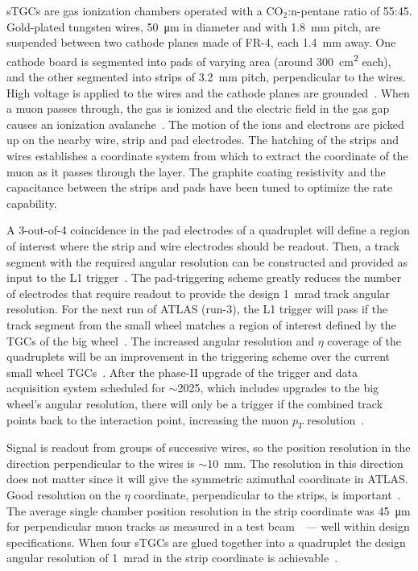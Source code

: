 sTGCs are gas ionization chambers operated with a CO$_2$:n-pentane ratio of 55:45. Gold-plated tungsten wires, \SI{50}{\micro\meter} in diameter and with \SI{1.8}{mm} pitch, are suspended between two cathode planes made of FR-4, each \SI{1.4}{mm} away. One cathode board is segmented into pads of varying area (around \SI{300}{cm^2} each), and the other segmented into strips of \SI{3.2}{mm} pitch, perpendicular to the wires. High voltage is applied to the wires and the cathode planes are grounded~\cite{nsw_tdr, perez-codina_small-strip_2016}. When a muon passes through, the gas is ionized and the electric field in the gas gap causes an ionization avalanche~\cite{townsend_electricity_1915}. The motion of the ions and electrons are picked up on the nearby wire, strip and pad electrodes. The hatching of the strips and wires establishes a coordinate system from which to extract the coordinate of the muon as it passes through the layer. The graphite coating resistivity and the capacitance between the strips and pads have been tuned to optimize the rate capability. 

A 3-out-of-4 coincidence in the pad electrodes of a quadruplet will define a region of interest where the strip and wire electrodes should be readout. Then, a track segment with the required angular resolution can be constructed and provided as input to the L1 trigger~\cite{nsw_tdr}. The pad-triggering scheme greatly reduces the number of electrodes that require readout to provide the design \SI{1}{mrad} track angular resolution. For the next run of ATLAS (run-3), the L1 trigger will pass if the track segment from the small wheel matches a region of interest defined by the TGCs of the big wheel~\cite{tdaq_phase1_tdr, nsw_tdr}. The increased angular resolution and $\eta$ coverage of the quadruplets will be an improvement in the triggering scheme over the current small wheel TGCs~\cite{nsw_tdr}. After the phase-II upgrade of the trigger and data acquisition system scheduled for $\sim$2025, which includes upgrades to the big wheel's angular resolution, there will only be a trigger if the combined track points back to the interaction point, increasing the muon $p_T$ resolution~\cite{nsw_tdr, tdaq_phase2_tdr}. 

Signal is readout from groups of successive wires, so the position resolution in the direction perpendicular to the wires is $\sim$\SI{10}{mm}. The resolution in this direction does not matter since it will give the symmetric azimuthal coordinate in ATLAS. Good resolution on the $\eta$ coordinate, perpendicular to the strips, is important~\cite{nsw_tdr}. The average single chamber position resolution in the strip coordinate was \SI{45}{\micro\meter} for perpendicular muon tracks as measured in a test beam~\cite{abusleme_performance_2016}~--- well within design specifications. When four sTGCs are glued together into a quadruplet the design angular resolution of \SI{1}{mrad} in the strip coordinate is achievable~\cite{nsw_tdr, perez-codina_small-strip_2016}. 

